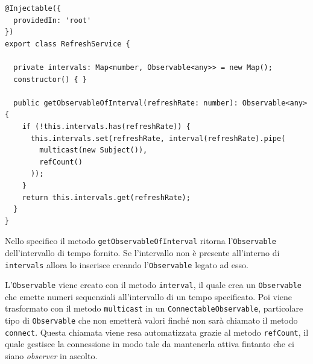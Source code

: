 \begin{lstlisting}[caption={Classe RefreshService}, style=javaScriptCode]
@Injectable({
  providedIn: 'root'
})
export class RefreshService {

  private intervals: Map<number, Observable<any>> = new Map();
  constructor() { }

  public getObservableOfInterval(refreshRate: number): Observable<any> {
    if (!this.intervals.has(refreshRate)) {
      this.intervals.set(refreshRate, interval(refreshRate).pipe(
        multicast(new Subject()),
        refCount()
      ));
    }
    return this.intervals.get(refreshRate);
  }
}
\end{lstlisting}
Nello specifico il metodo \verb|getObservableOfInterval| ritorna l'\verb|Observable| dell'intervallo di tempo fornito. Se l'intervallo non è presente all'interno di \verb|intervals| allora lo inserisce creando l'\verb|Observable| legato ad esso.

L'\verb|Observable| viene creato con il metodo \verb|interval|, il quale crea un \verb|Observable| che emette numeri sequenziali all'intervallo di un tempo specificato. Poi viene trasformato con il metodo \verb|multicast| in un \verb|ConnectableObservable|, particolare tipo di \verb|Observable| che non emetterà valori finché non sarà chiamato il metodo \verb|connect|. Questa chiamata viene resa automatizzata grazie al metodo \verb|refCount|, il quale gestisce la connessione in modo tale da mantenerla attiva fintanto che ci siano \textit{observer} in ascolto.


